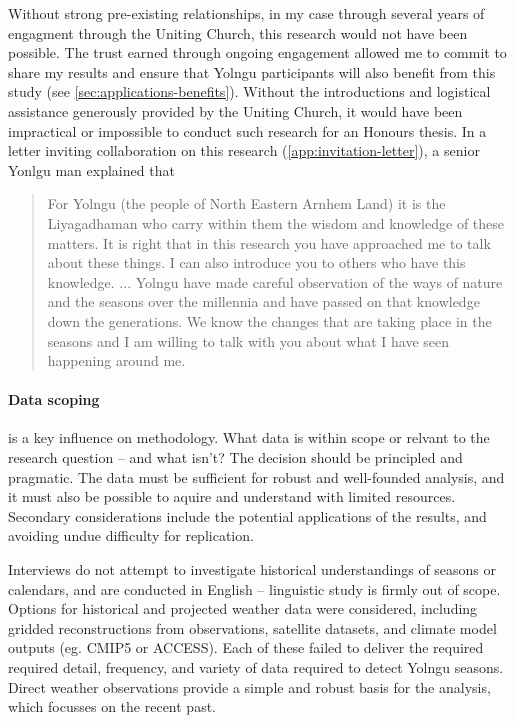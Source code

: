 Without strong pre-existing relationships, in my case through several
years of engagment through the Uniting Church, this research would not
have been possible.  The trust earned through ongoing engagement allowed
me to commit to share my results and ensure that Yolngu participants will
also benefit from this study (see \cref{sec:applications-benefits}).  Without the introductions and logistical
assistance generously provided by the Uniting Church, it would have been impractical or
impossible to conduct such research for an Honours thesis.
%
In a letter inviting collaboration on this research (\cref{app:invitation-letter}),
a senior Yonlgu man explained that
\begin{quote} %
    For Yolngu (the people of North Eastern Arnhem Land) it is the Liyagadhaman
    who carry within them the wisdom and knowledge of these matters.
    It is right that in this research you have approached me to talk about these
    things. I can also introduce you to others who have this knowledge.
    ...
    Yolngu have made careful observation of the ways of nature and the seasons
    over the millennia and have passed on that knowledge down the generations.
    We know the changes that are taking place in the seasons and I am willing
    to talk with you about what I have seen happening around me.
\end{quote}


\paragraph{Data scoping} is a key influence on methodology.
What data is within scope or relvant to the research question --
and what isn't?
%
The decision should be principled and pragmatic.
The data must be sufficient for robust and well-founded analysis,
and it must also be possible to aquire and understand with limited
resources.  Secondary considerations include the potential applications
of the results, and avoiding undue difficulty for replication.


Interviews do not attempt to investigate historical understandings of
seasons or calendars, and are conducted in English -- linguistic study
is firmly out of scope.
%
Options for historical and projected weather data were considered, including
gridded reconstructions from observations, satellite datasets, and climate
model outputs (eg. CMIP5 or ACCESS).  Each of these failed to deliver the
required required detail, frequency, and variety of data required to detect
Yolngu seasons.  Direct weather observations provide a simple and robust basis
for the analysis, which focusses on the recent past.

